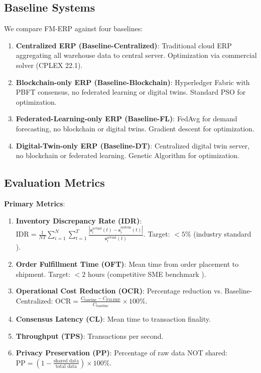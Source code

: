 \documentclass[times,10pt,twocolumn]{jucs2e}
\begin{document}
\subsection{Baseline Systems}

We compare FM-ERP against four baselines:

\begin{enumerate}
\item \textbf{Centralized ERP (Baseline-Centralized)}: Traditional cloud ERP aggregating all warehouse data to central server. Optimization via commercial solver (CPLEX 22.1).

\item \textbf{Blockchain-only ERP (Baseline-Blockchain)}: Hyperledger Fabric with PBFT consensus, no federated learning or digital twins. Standard PSO for optimization.

\item \textbf{Federated-Learning-only ERP (Baseline-FL)}: FedAvg \cite{McMahan2017} for demand forecasting, no blockchain or digital twins. Gradient descent for optimization.

\item \textbf{Digital-Twin-only ERP (Baseline-DT)}: Centralized digital twin server, no blockchain or federated learning. Genetic Algorithm for optimization.
\end{enumerate}

\subsection{Evaluation Metrics}

\textbf{Primary Metrics}:
\begin{enumerate}
\item \textbf{Inventory Discrepancy Rate (IDR)}: $\text{IDR} = \frac{1}{NT} \sum_{i=1}^N \sum_{t=1}^T \frac{|\mathbf{s}_i^{\text{actual}}(t) - \mathbf{s}_i^{\text{system}}(t)|}{\mathbf{s}_i^{\text{actual}}(t)}$. Target: $< 5\%$ (industry standard \cite{Davis2023}).

\item \textbf{Order Fulfillment Time (OFT)}: Mean time from order placement to shipment. Target: $< 2$ hours (competitive SME benchmark \cite{Garcia2024}).

\item \textbf{Operational Cost Reduction (OCR)}: Percentage reduction vs. Baseline-Centralized: $\text{OCR} = \frac{C_{\text{baseline}} - C_{\text{FM-ERP}}}{C_{\text{baseline}}} \times 100\%$.

\item \textbf{Consensus Latency (CL)}: Mean time to transaction finality.

\item \textbf{Throughput (TPS)}: Transactions per second.

\item \textbf{Privacy Preservation (PP)}: Percentage of raw data NOT shared: $\text{PP} = (1 - \frac{\text{shared data}}{\text{total data}}) \times 100\%$.
\end{enumerate}
\end{document}

